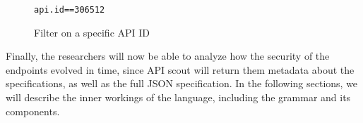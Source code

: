 \begin{figure}[!h]
    \begin{center}
        \verb|api.id==306512|
    \end{center}

    \caption{Filter on a specific API ID}
    \label{fig:filter-apis}
\end{figure}

\noindent Finally, the researchers will now be able to analyze how the security of the endpoints evolved in time, since API scout will return them metadata about the specifications, as well as the full JSON specification.
In the following sections, we will describe the inner workings of the language, including the grammar and its components.






